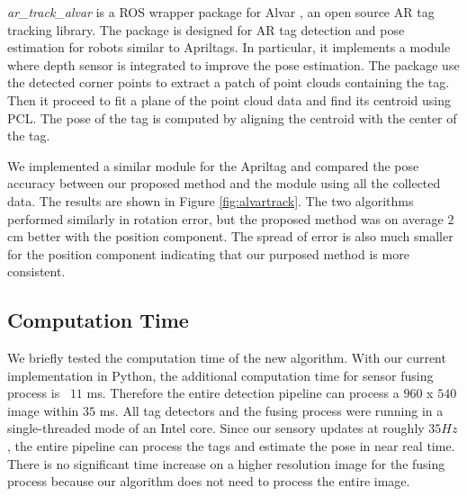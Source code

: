 \textit{ar\_track\_alvar} is a ROS wrapper package for Alvar \citep{alvartrack}, an open source AR tag tracking library. The package is designed for AR tag detection and pose estimation for robots similar to Apriltags. In particular, it implements a module where depth sensor is integrated to improve the pose estimation. The package use the detected corner points to extract a patch of point clouds containing the tag. Then it proceed to fit a plane of the point cloud data and find its centroid using PCL. The pose of the tag is computed by aligning the centroid with the center of the tag.   

We implemented a similar module for the Apriltag and compared the pose accuracy between our proposed method and the module using all the collected data. The results are shown in Figure \ref{fig:alvartrack}. The two algorithms performed similarly in rotation error, but the proposed method was on average $2$ cm better with the position component. The spread of error is also much smaller for the position component indicating that our purposed method is more consistent.

\subsection{Computation Time}
We briefly tested the computation time of the new algorithm. With our current implementation in Python, the additional computation time for sensor fusing process is ~$11$ ms. Therefore the entire detection pipeline can process a $960$ x $540$ image within $35$ ms. All tag detectors and the fusing process were running in a single-threaded mode of an Intel core. Since our sensory updates at roughly $35Hz$, the entire pipeline can process the tags and estimate the pose in near real time. There is no significant time increase on a higher resolution image for the fusing process because our algorithm does not need to process the entire image.